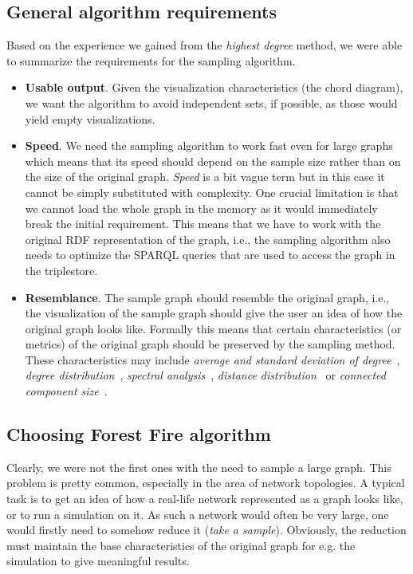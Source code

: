 \subsection{General algorithm requirements}

Based on the experience we gained from the \emph{highest degree} method, we were able to summarize the requirements for the sampling algorithm.

\begin{itemize}
\item \textbf{Usable output}. Given the visualization characteristics (the chord diagram), we want the algorithm to avoid independent sets, if possible, as those would yield empty visualizations.
\item \textbf{Speed}. We need the sampling algorithm to work fast even for large graphs which means that its speed should depend on the sample size rather than on the size of the original graph. \emph{Speed} is a bit vague term but in this case it cannot be simply substituted with complexity. One crucial limitation is that we cannot load the whole graph in the memory as it would immediately break the initial requirement. This means that we have to work with the original RDF representation of the graph, i.e., the sampling algorithm also needs to optimize the SPARQL queries that are used to access the graph in the triplestore. 
\item \textbf{Resemblance}. The sample graph should resemble the original graph, i.e., the visualization of the sample graph should give the user an idea of how the original graph looks like. Formally this means that certain characteristics (or metrics) of the original graph should be preserved by the sampling method. These characteristics may include 
\emph{average and standard deviation of degree}~\cite{krishnamurthy2005reducing},
\emph{degree distribution}~\cite{krishnamurthy2005reducing},
\emph{spectral analysis}~\cite{krishnamurthy2005reducing},
\emph{distance distribution}~\cite{gilbert2004compressing} or
\emph{connected component size}~\cite{rafiei2005effectively}.

\end{itemize}
\subsection{Choosing Forest Fire algorithm}

Clearly, we were not the first ones with the need to sample a large graph. This problem is pretty common, especially in the area of network topologies. A typical task is to get an idea of how a real-life network represented as a graph looks like, or to run a simulation on it. As such a network would often be very large, one would firstly need to somehow reduce it (\emph{take a sample}). Obviously, the reduction must maintain the base characteristics of the original graph for e.g. the simulation to give meaningful results.

